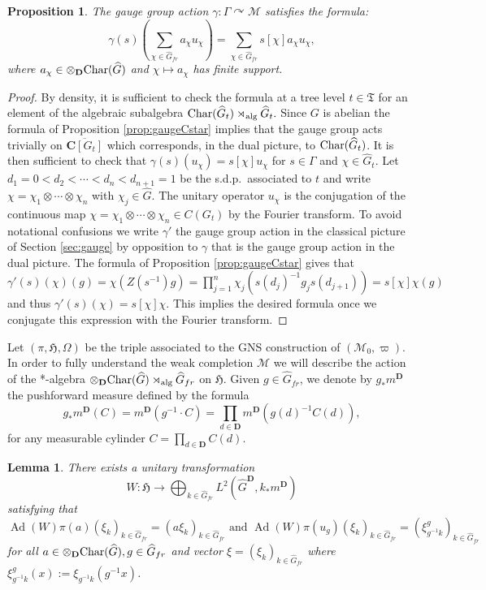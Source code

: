 \documentclass[a4paper,12pt]{amsart}
\numberwithin{equation}{section}
\newtheorem{lemma}[theo]{Lemma}
\newtheorem{proposition}[theo]{Proposition}
\theoremstyle{definition}
\newcommand{\act}{\curvearrowright}
\DeclareMathOperator{\Ad}{Ad}
\DeclareMathOperator{\alg}{alg}
\newcommand{\C}{\mathbf C}
\newcommand{\Ch}{\textup{Char}}
\newcommand{\D}{\mathbf D}
\newcommand{\fH}{\mathfrak H}
\newcommand{\ga}{\gamma}
\newcommand{\Ga}{\Gamma}
\newcommand{\scrM}{\mathscr M}
\newcommand{\ot}{\otimes}\newcommand{\otmin}{\otimes_{\text{min}}}
\newcommand{\fT}{\mathfrak T}
\newcommand{\wh}{\widehat}
\begin{document}
\begin{proposition}
The gauge group action $\ga:\Ga\act \scrM$ satisfies the formula:
$$\ga(s)\left(\sum_{\chi\in\wh G_{fr}} a_\chi u_\chi \right) = \sum_{\chi\in\wh G_{fr}} s[\chi] a_\chi u_\chi,$$
where $a_\chi\in\ot_\D \Ch(\wh G)$ and $\chi\mapsto a_\chi$ has finite support.
\end{proposition}
\begin{proof}
By density, it is sufficient to check the formula at a tree level $t\in\fT$ for an element of the algebraic subalgebra $ \Ch(\wh G_t)\rtimes_{\alg} \wh G_t.$
Since $G$ is abelian the formula of Proposition \ref{prop:gaugeCstar} implies that the gauge group acts trivially on $\overline{\C[G_t]}$ which corresponds, in the dual picture, to $ \Ch(\wh G_t)$.
It is then sufficient to check that $\gamma(s)(u_\chi) = s[\chi] u_\chi$ for $s\in \Ga$ and $\chi\in \wh G_t$.
Let $d_1=0<d_2<\cdots< d_n<d_{n+1} =1$ be the s.d.p.~associated to $t$ and write $\chi=\chi_1\ot\cdots\ot \chi_n$ with $\chi_j\in\wh G.$
The unitary operator $u_\chi$ is the conjugation of the continuous map $\chi=\chi_1\ot\cdots\ot \chi_n\in C(G_t)$ by the Fourier transform.
To avoid notational confusions we write $\ga'$ the gauge group action in the classical picture of Section \ref{sec:gauge} by opposition to $\ga$ that is the gauge group action in the dual picture. 
The formula of Proposition \ref{prop:gaugeCstar} gives that $\ga'(s)(\chi)(g) = \chi(Z(s^{-1} ) g) = \prod_{j=1}^n \chi_j(s(d_j)^{-1} g_j s(d_{j+1}) ) = s[\chi] \chi(g)$ and thus $\ga'(s)(\chi) = s[\chi]\chi.$
This implies the desired formula once we conjugate this expression with the Fourier transform.
\end{proof}


Let $(\pi,\fH,\Omega)$ be the triple associated to the GNS construction of $(\scrM_0,\varpi).$
In order to fully understand the weak completion $\scrM$ we will describe the action of the *-algebra $\ot_\D \Ch(\wh G)\rtimes_{\alg} \wh G_{fr}$ on $\fH$.
Given $g\in \wh G_{fr}$, we denote by $g_*m^\D$ the pushforward measure defined by the formula
$$g_*m^\D(C) = m^\D(g^{-1} \cdot C) = \prod_{d\in\D} m^\D(g(d)^{-1} C(d)),$$
for any measurable cylinder $C=\prod_{d\in \D} C(d).$

\begin{lemma}\label{lem:GNSmodule}
There exists a unitary transformation 
$$W:\fH\to \bigoplus_{k\in \wh G_{fr}} L^2( {\wh G}^\D ,k_* m^\D )$$
satisfying that 
$$\Ad(W) \pi( a) ( \xi_k )_{k\in \wh G_{fr}} =( a \xi_k )_{k\in \wh G_{fr}} \text{ and } \Ad(W) \pi( u_g ) (\xi_k )_{k\in \wh G_{fr}} = (\xi_{g^{-1}k }^g )_{k\in \wh G_{fr}}$$
for all $a\in\ot_\D \Ch(\wh G), g\in\wh G_{fr}$ and vector $\xi = ( \xi_k )_{ k\in \wh G_{fr} } $ where $\xi_{ g^{-1} k }^g (x) := \xi_{ g^{-1} k } ( g^{-1} x )$.
\end{lemma}
\end{document}
